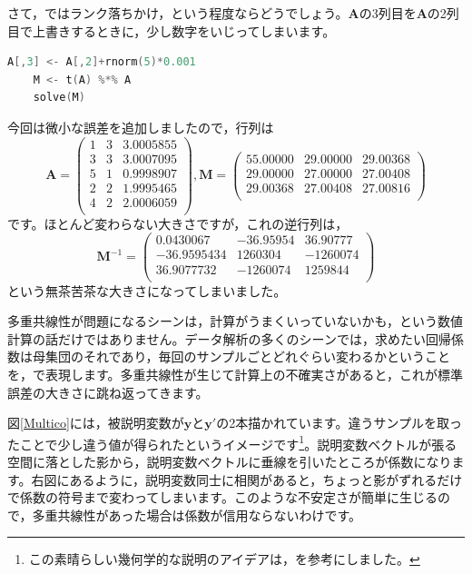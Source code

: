 \documentclass{ltjsbook}
\begin{document}
さて，ではランク落ちかけ，という程度ならどうでしょう。$\bm{A}$の3列目を$\bm{A}$の2列目で上書きするときに，少し数字をいじってしまいます。
\begin{lstlisting}[language=C++,label={Multico3},caption={ランクおちかけ}]
    A[,3] <- A[,2]+rnorm(5)*0.001
    M <- t(A) %*% A
    solve(M)
    \end{lstlisting}
今回は微小な誤差を追加しましたので，行列は
\[
	\bm{A} =
	\begin{pmatrix}
		1 & 3 & 3.0005855 \\
		3 & 3 & 3.0007095 \\
		5 & 1 & 0.9998907 \\
		2 & 2 & 1.9995465 \\
		4 & 2 & 2.0006059 \\
	\end{pmatrix},
	\bm{M} =
	\begin{pmatrix}
		55.00000 & 29.00000 & 29.00368 \\
		29.00000 & 27.00000 & 27.00408 \\
		29.00368 & 27.00408 & 27.00816 \\
	\end{pmatrix}
\]
です。ほとんど変わらない大きさですが，これの逆行列は，
\[
	\bm{M}^{-1} =
	\begin{pmatrix}
		0.0430067   & -36.95954 & 36.90777 \\
		-36.9595434 & 1260304   & -1260074 \\
		36.9077732  & -1260074  & 1259844  \\
	\end{pmatrix}
\]
という無茶苦茶な大きさになってしまいました。


多重共線性が問題になるシーンは，計算がうまくいっていないかも，という数値計算の話だけではありません。データ解析の多くのシーンでは，求めたい回帰係数は母集団のそれであり，毎回のサンプルごとどれぐらい変わるかということを，で表現します。多重共線性が生じて計算上の不確実さがあると，これが標準誤差の大きさに跳ね返ってきます。

図\ref{Multico}には，被説明変数が$\bm{y}$と$\bm{y}'$の2本描かれています。違うサンプルを取ったことで少し違う値が得られたというイメージです\footnote{この素晴らしい幾何学的な説明のアイデアは，\textcite{Haebara200206}を参考にしました。}。説明変数ベクトルが張る空間に落とした影から，説明変数ベクトルに垂線を引いたところが係数になります。右図にあるように，説明変数同士に相関があると，ちょっと影がずれるだけで係数の符号まで変わってしまいます。このような不安定さが簡単に生じるので，多重共線性があった場合は係数が信用ならないわけです。
\end{document}
